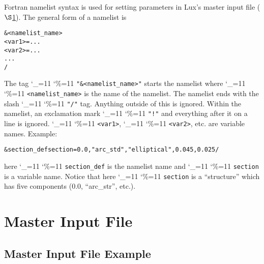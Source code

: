 \documentclass[11pt]{article}
\newcommand{\lux}{Lux\xspace}
\newcommand\ttcmd{\begingroup\catcode`\_=11 \catcode`\%=11 \dottcmd}
\newcommand\dottcmd[1]{\texttt{#1}\endgroup}
\newcommand{\vn}{\ttcmd}
\newcommand{\sref}[1]{$\S$\ref{#1}}
\newenvironment{example}
  {\vspace{\ExBeg} \begin{alltt}}
  {\end{alltt} \vspace{\ExEnd}}
\newlength{\ExBeg}
\newlength{\ExEnd}
\begin{document}
Fortran namelist syntax is used for setting parameters in \lux's
master input file (\sref{s:master.file}). The general form of a
namelist is
\begin{example}
  &<namelist_name>
    <var1> = ...
    <var2> = ...
    ...
  /
\end{example}
The tag \vn{"\&<namelist_name>"} starts the namelist where
\vn{<namelist_name>} is the name of the namelist. The namelist ends
with the slash \vn{"/"} tag. Anything outside of this is
ignored. Within the namelist, an exclamation mark \vn{"!"} and
everything after it on a line is ignored. \vn{<var1>}, \vn{<var2>},
etc. are variable names. Example:
\begin{example}
  &section_def section =   0.0, "arc_std", "elliptical", 0.045, 0.025 /
\end{example}
here \vn{section_def} is the namelist name and \vn{section} is a variable
name.  Notice that here \vn{section} is a ``structure'' which has five
components (0.0, ``arc_str'', etc.).

\section{Master Input File} 
\label{s:master.file}

\subsection{Master Input File Example}
\label{ss:master.example}
\end{document}

